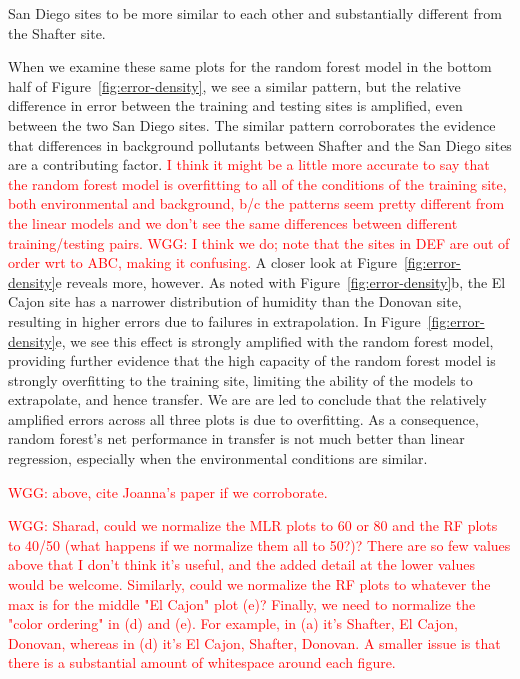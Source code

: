 \documentclass[journal abbreviation, manuscript]{copernicus}
\newcommand\todo[1]{\textcolor{red}{#1}}
\begin{document}
San Diego sites to be more similar to each other and substantially different from the Shafter site.

When we examine these same plots for the random forest model in the bottom half of Figure~\ref{fig:error-density}, we see a similar pattern, but the relative difference in error between the training and testing sites is amplified, even between the two San Diego sites.  The similar pattern corroborates the evidence that differences in background pollutants between Shafter and the San Diego sites are a contributing factor. \todo{I think it might be a little more accurate to say that the random forest model is overfitting to all of the conditions of the training site, both environmental and background, b/c the patterns seem pretty different from the linear models and we don't see the same differences between different training/testing pairs.  WGG: I think we do; note that the sites in DEF are out of order wrt to ABC, making it confusing.}   A closer look at Figure~\ref{fig:error-density}e reveals more, however.  As noted with Figure~\ref{fig:error-density}b, the El Cajon site has a narrower distribution of humidity than the Donovan site, resulting in higher errors due to failures in extrapolation.  In Figure~\ref{fig:error-density}e, we see this effect is strongly amplified with the random forest model, providing further evidence that the high capacity of the random forest model is strongly overfitting to the training site, limiting the ability of the models to extrapolate, and hence transfer.  We are are led to conclude that the relatively amplified errors across all three plots is due to overfitting.  As a consequence, random forest's net performance in transfer is not much better than linear regression, especially when the environmental conditions are similar.

\todo{WGG: above, cite Joanna's paper if we corroborate.}

\todo{WGG: Sharad, could we normalize the MLR plots to 60 or 80 and the RF plots to 40/50 (what happens if we normalize them all to 50?)?  There are so few values above that I don't think it's useful, and the added detail at the lower values would be welcome.  Similarly, could we normalize the RF plots to whatever the max is for the middle "El Cajon" plot (e)?  Finally, we need to normalize the "color ordering" in (d) and (e).  For example, in (a) it's Shafter, El Cajon, Donovan, whereas in (d) it's El Cajon, Shafter, Donovan.  A smaller issue is that there is a substantial amount of whitespace around each figure.}
\end{document}
